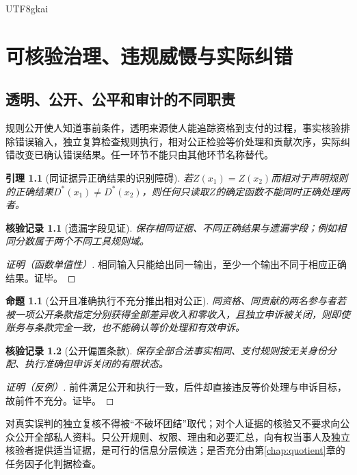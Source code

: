 \documentclass[12pt,a4paper,openany]{report}
\newtheorem{lemma}{引理}[chapter]
\newtheorem{proposition}{命题}[chapter]
\newtheorem{Certificate}{核验记录}[chapter]
\begin{document}
\begin{CJK*}{UTF8}{gkai}
\chapter{可核验治理、违规威慑与实际纠错}
\label{chap:governance}
\section{透明、公开、公平和审计的不同职责}
规则公开使人知道事前条件，透明来源使人能追踪资格到支付的过程，事实核验排除错误输入，独立复算检查规则执行，相对公正检验等价处理和贡献次序，实际纠错改变已确认错误结果。任一环节不能只由其他环节名称替代\cite[“透明、公开、相对公正与治理成本”]{SourceSupplement}。
\begin{lemma}[同证据异正确结果的识别障碍]
\label{lem:information}
若$Z(x_1)=Z(x_2)$而相对于声明规则的正确结果$D^*(x_1)\ne D^*(x_2)$，则任何只读取$Z$的确定函数不能同时正确处理两者。
\end{lemma}
\begin{Certificate}[遗漏字段见证]
保存相同证据、不同正确结果与遗漏字段；例如相同分数属于两个不同工具规则域。
\end{Certificate}
\begin{proof}[证明（函数单值性）]
相同输入只能给出同一输出，至少一个输出不同于相应正确结果。证毕。
\end{proof}
\begin{proposition}[公开且准确执行不充分推出相对公正]
\label{prop:fairness}
同资格、同贡献的两名参与者若被一项公开条款指定分别获得全部差异收入和零收入，且独立申诉被关闭，则即使账务与条款完全一致，也不能确认等价处理和有效申诉。
\end{proposition}
\begin{Certificate}[公开偏置条款]
保存全部合法事实相同、支付规则按无关身份分配、执行准确但申诉关闭的有限状态。
\end{Certificate}
\begin{proof}[证明（反例）]
前件满足公开和执行一致，后件却直接违反等价处理与申诉目标，故前件不充分。证毕。
\end{proof}
对真实误判的独立复核不得被“不破坏团结”取代；对个人证据的核验又不要求向公众公开全部私人资料。只公开规则、权限、理由和必要汇总，向有权当事人及独立核验者提供适当证据，是可行的信息分层候选；是否充分由第\ref{chap:quotient}章的任务因子化判据检查。


\end{CJK*}
\end{document}
